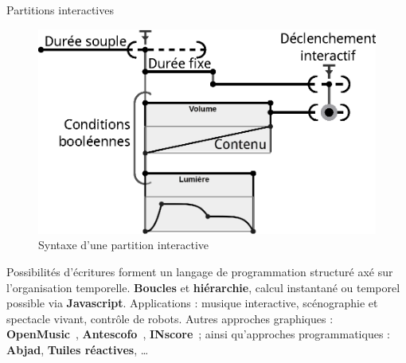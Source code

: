 \begin{block}{Partitions interactives}
\begin{figure}
\includegraphics[width=\columnwidth]{images/score.eps}
\caption{Syntaxe d'une partition interactive}
\end{figure}
Possibilités d'écritures forment un langage de programmation structuré axé sur l'organisation temporelle. 
\textbf{Boucles} et \textbf{hiérarchie}, calcul instantané ou temporel possible via \textbf{Javascript}.
Applications : musique interactive, scénographie et spectacle vivant, contrôle de robots.
Autres approches graphiques : \textbf{OpenMusic}~\cite{bresson_openmusic:_2011}, \textbf{Antescofo}~\cite{cont2008antescofo}, \textbf{INscore}~\cite{fober2012environment}; ainsi qu'approches programmatiques : \textbf{Abjad}, \textbf{Tuiles réactives}, \dots
\end{block}